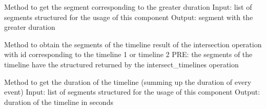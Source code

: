 
\begin{fulllineitems}
\label{\detokenize{eboa.ingestion:eboa.ingestion.functions.get_greater_segment}}
Method to get the segment corresponding to the greater duration
Input: list of segments structured for the usage of this component
Output: segment with the greater duration

\end{fulllineitems}


\begin{fulllineitems}
\label{\detokenize{eboa.ingestion:eboa.ingestion.functions.get_intersected_timeline_with_idx}}
Method to obtain the segments of the timeline result of the intersection operation with id corresponding to the timeline 1 or timeline 2
PRE: the segments of the timeline have the structured returned by the intersect\_timelines operation

\end{fulllineitems}


\begin{fulllineitems}
\label{\detokenize{eboa.ingestion:eboa.ingestion.functions.get_timeline_duration}}
Method to get the duration of the timeline (summing up the duration of every event)
Input: list of segments structured for the usage of this component
Output: duration of the timeline in seconds

\end{fulllineitems}

